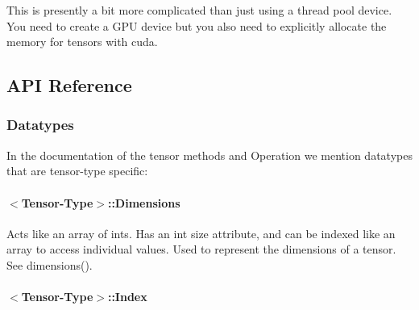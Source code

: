 This is presently a bit more complicated than just using a thread pool device. You need to create a G\+PU device but you also need to explicitly allocate the memory for tensors with cuda.

\subsection*{A\+PI Reference}

\subsubsection*{Datatypes}

In the documentation of the tensor methods and Operation we mention datatypes that are tensor-\/type specific\+:

\paragraph*{$<$Tensor-\/\+Type$>$\+::\+Dimensions}

Acts like an array of ints. Has an {\ttfamily int size} attribute, and can be indexed like an array to access individual values. Used to represent the dimensions of a tensor. See {\ttfamily dimensions()}.

\paragraph*{$<$Tensor-\/\+Type$>$\+::\+Index}

